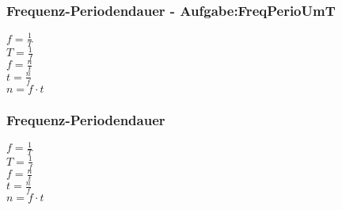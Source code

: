 \subsubsection{Frequenz-Periodendauer - Aufgabe:FreqPerioUmT} 
\begin{minipage}{0.45\textwidth} 
$ f = \frac{1}{T} $\\ 
$ T = \frac{1}{f} $\\ 
$ f = \frac{n}{t} $\\ 
$ t = \frac{n}{f} $\\ 
$ n = f\cdot t $\\ 
\end{minipage} 
\begin{minipage}{0.45\textwidth} 
 
\end{minipage} 
\subsubsection{Frequenz-Periodendauer} 
\begin{minipage}{0.45\textwidth} 
$ f = \frac{1}{T} $\\ 
$ T = \frac{1}{f} $\\ 
$ f = \frac{n}{t} $\\ 
$ t = \frac{n}{f} $\\ 
$ n = f\cdot t $\\ 
\end{minipage} 
\begin{minipage}{0.45\textwidth} 
 
\end{minipage} 
